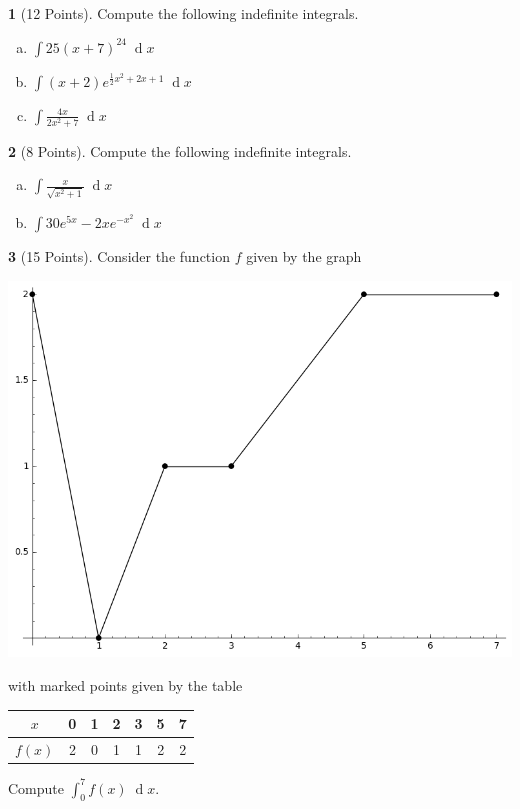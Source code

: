 \documentclass[12pt]{amsart}
\theoremstyle{definition}
\newtheorem{thm}{}
\theoremstyle{definition}
\newcommand{\dx}[1]{\!\!\;\operatorname{d}\!#1}
\begin{document}
\newpage
\begin{thm}[12 Points]
  Compute the following indefinite integrals.
  \begin{enumerate}[(a)]
  \item
    $\displaystyle{\int 25(x + 7)^{24} \dx{x}}$
    \vspace{2in}
  \item
    $\displaystyle{\int (x + 2)e^{\frac{1}{2}x^2 + 2x + 1}\dx{x}}$
    \vspace{2in}
  \item
    $\displaystyle{\int \frac{4x}{2x^2 + 7}\dx{x}}$
  \end{enumerate}
\end{thm}

\newpage
\begin{thm}[8 Points]
  Compute the following indefinite integrals.
\begin{enumerate}[(a)]
    \item
    $\displaystyle{\int \frac{x}{\sqrt{x^2 + 1}}\dx{x}}$
    \vspace{4in}
  \item
    $\displaystyle{\int 30e^{5x} - 2xe^{-x^2}\dx{x}}$
\end{enumerate}
\end{thm}

\newpage
\begin{thm}[15 Points]
  Consider the function $f$ given by the graph
  \begin{center}
    \includegraphics[scale=0.5]{imgs/geometricIntegral.png}
  \end{center}
  with marked points given by the table
  \begin{center}
    \begin{tabular}{c||cccccc}
      $x$ & 0 & 1 & 2 & 3 & 5 & 7\\
      \hline
      $f(x)$ & 2 & 0 & 1 & 1 & 2 & 2
    \end{tabular}
  \end{center}
  Compute $\displaystyle{\int_0^7 f(x)\dx{x}}$.
\end{thm}
\newpage
\end{document}

